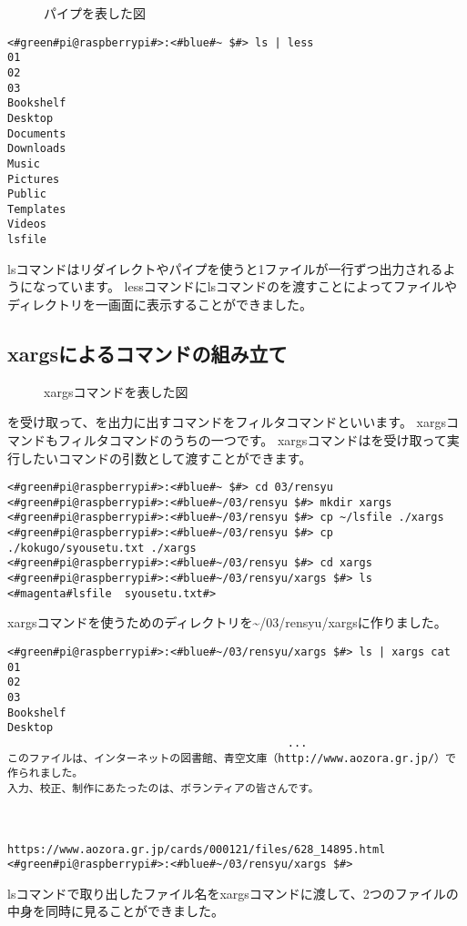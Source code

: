 \begin{figure}
    \centering
    
    \caption{パイプを表した図}
    \label{ch03:pipe}
\end{figure}


\begin{lstlisting}[caption=lsコマンドの出力をパイプでlessコマンドに渡す, label=redirectCat]
<#green#pi@raspberrypi#>:<#blue#~ $#> ls | less
01
02
03
Bookshelf
Desktop
Documents
Downloads
Music
Pictures
Public
Templates
Videos
lsfile
\end{lstlisting}

lsコマンドはリダイレクトやパイプを使うと1ファイルが一行ずつ出力されるようになっています。
lessコマンドにlsコマンドのを渡すことによってファイルやディレクトリを一画面に表示することができました。

\subsection{xargsによるコマンドの組み立て}

\begin{figure}
    \centering
    
    \caption{xargsコマンドを表した図}
    \label{ch03:xargs_command}
\end{figure}

を受け取って、を出力に出すコマンドをフィルタコマンドといいます。
xargsコマンドもフィルタコマンドのうちの一つです。
xargsコマンドはを受け取って実行したいコマンドの引数として渡すことができます。

\begin{lstlisting}[caption=xargsコマンドを使う準備をする]
<#green#pi@raspberrypi#>:<#blue#~ $#> cd 03/rensyu
<#green#pi@raspberrypi#>:<#blue#~/03/rensyu $#> mkdir xargs
<#green#pi@raspberrypi#>:<#blue#~/03/rensyu $#> cp ~/lsfile ./xargs
<#green#pi@raspberrypi#>:<#blue#~/03/rensyu $#> cp ./kokugo/syousetu.txt ./xargs
<#green#pi@raspberrypi#>:<#blue#~/03/rensyu $#> cd xargs 
<#green#pi@raspberrypi#>:<#blue#~/03/rensyu/xargs $#> ls
<#magenta#lsfile  syousetu.txt#>
\end{lstlisting}
xargsコマンドを使うためのディレクトリを\textasciitilde /03/rensyu/xargsに作りました。

\begin{lstlisting}[caption=xargsコマンドを使ってcatコマンドを使う]
<#green#pi@raspberrypi#>:<#blue#~/03/rensyu/xargs $#> ls | xargs cat
01
02
03
Bookshelf
Desktop
                                           ...
このファイルは、インターネットの図書館、青空文庫（http://www.aozora.gr.jp/）で作られました。
入力、校正、制作にあたったのは、ボランティアの皆さんです。



https://www.aozora.gr.jp/cards/000121/files/628_14895.html
<#green#pi@raspberrypi#>:<#blue#~/03/rensyu/xargs $#>
\end{lstlisting}
lsコマンドで取り出したファイル名をxargsコマンドに渡して、2つのファイルの中身を同時に見ることができました。

